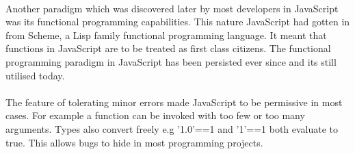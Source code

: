 \paragraph{}
Another paradigm which was discovered later by most developers in JavaScript was its functional programming capabilities\cite{JS}. This nature JavaScript had gotten in from Scheme, a Lisp family functional programming language. It meant that functions in JavaScript are to be treated as first  class citizens. The functional programming paradigm in JavaScript has been persisted  ever since and its still utilised today\cite{JS}.
\paragraph{}
The feature of tolerating minor errors made JavaScript to be permissive in most cases. For example a function can be invoked with too few or too many arguments. Types also convert freely e.g '1.0'==1 and '1'==1 both evaluate to true\cite{Eich:2005:JTY:1090189.1086382}. This allows bugs to hide in most programming projects.